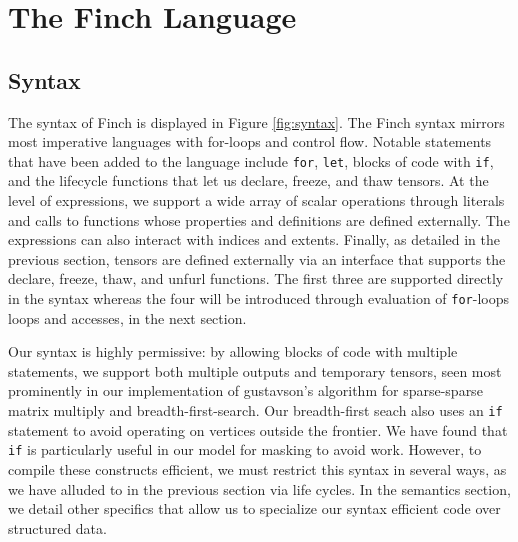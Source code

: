 
\section{The Finch Language}

\subsection{Syntax}

The syntax of Finch is displayed in Figure \ref{fig:syntax}. The Finch syntax
mirrors most imperative languages with for-loops and control flow. Notable
statements that have been added to the language include \texttt{for},
\texttt{let}, blocks of code with \texttt{if}, and 
the lifecycle functions that let us declare, freeze, and thaw tensors.
%
At the level of expressions, we support a wide array of scalar operations through literals and calls to functions whose properties and definitions are defined externally.
%
The expressions can also interact with indices and extents.
Finally, as detailed in the previous section, tensors are defined externally via an interface that supports the declare, freeze, thaw, and unfurl functions.
%
The first three are supported directly in the syntax whereas the four will be introduced through evaluation of \texttt{for}-loops loops and accesses,
in the next section.
%

Our syntax is highly permissive: by allowing blocks of code with multiple statements, we support both multiple outputs and temporary tensors, seen most prominently in our implementation of gustavson's algorithm for sparse-sparse matrix multiply and breadth-first-search.
%
Our breadth-first seach also uses an
\texttt{if} statement to avoid operating on vertices outside the
frontier. 
%
We have found that \texttt{if} is particularly useful in
our model for masking to avoid work.
%
However, to compile these constructs efficient, we must restrict this syntax in several ways, as we have alluded to in the previous section via life cycles.
%
In the semantics section, we detail other specifics that allow us to specialize our syntax efficient code over structured data.



